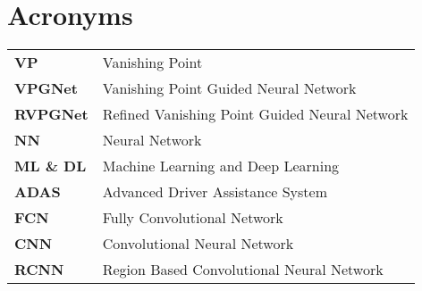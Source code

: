\chapter*{\centering Acronyms}
\begin{spacing}{1.5}
\setlength{\parskip}{0.3in}
\thispagestyle{addin}

\begin{table}[ht]
\centering
\begin{tabular}{ll}
\textbf{VP} & Vanishing Point \\
\textbf{VPGNet} & Vanishing Point Guided Neural Network \\
\textbf{RVPGNet} & Refined Vanishing Point Guided Neural Network \\
\textbf{NN} & Neural Network \\
\textbf{ML \& DL} & Machine Learning and Deep Learning \\
\textbf{ADAS} & Advanced Driver Assistance System \\
\textbf{FCN} & Fully Convolutional Network \\
\textbf{CNN} & Convolutional Neural Network \\
\textbf{RCNN} & Region Based Convolutional Neural Network
\end{tabular}%
\end{table}

\end{spacing}
\newpage
